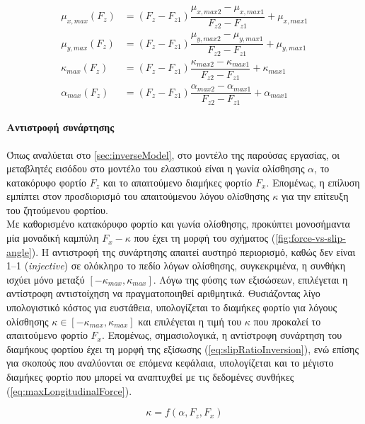 \begin{align}
    \mu_{x,max}(F_z) &= (F_z - F_{z1})
    \dfrac{\mu_{x,max2} - \mu_{x,max1}}{F_{z2}-F_{z1}} + \mu_{x,max1}
    \label{eq:mu_load1}\\[10pt]
    \mu_{y,max}(F_z) &= (F_z - F_{z1})
    \dfrac{\mu_{y,max2} - \mu_{y,max1}}{F_{z2}-F_{z1}} + \mu_{y,max1}
    \label{eq:mu_load2}\\[10pt]
    \kappa_{max}(F_z) &= (F_z - F_{z1})
    \dfrac{\kappa_{max2} - \kappa_{max1}}{F_{z2}-F_{z1}} + \kappa_{max1}
    \label{eq:mu_load3}\\[10pt]
    \alpha_{max}(F_z) &= (F_z - F_{z1})
    \dfrac{\alpha_{max2} - \alpha_{max1}}{F_{z2}-F_{z1}} + \alpha_{max1}
    \label{eq:mu_load}
\end{align}

\paragraph{Αντιστροφή συνάρτησης}
Όπως αναλύεται στο \cref{sec:inverseModel}, στο μοντέλο της παρούσας εργασίας, οι μεταβλητές εισόδου στο μοντέλο του ελαστικού είναι η γωνία ολίσθησης $\alpha$, το κατακόρυφο φορτίο $F_z$ και το απαιτούμενο διαμήκες φορτίο $F_x$. Επομένως, η επίλυση εμπίπτει στον προσδιορισμό του απαιτούμενου λόγου ολίσθησης $\kappa$ για την επίτευξη του ζητούμενου φορτίου.\\[5pt]
\noindent
Με καθορισμένο κατακόρυφο φορτίο και γωνία ολίσθησης, προκύπτει μονοσήμαντα μία μοναδική καμπύλη $F_x - \kappa$ που έχει τη μορφή του σχήματος (\ref{fig:force-vs-slip-angle}). Η αντιστροφή της συνάρτησης απαιτεί αυστηρό περιορισμό, καθώς δεν είναι 1--1 (\textit{injective}) σε ολόκληρο το πεδίο λόγων ολίσθησης, συγκεκριμένα, η συνθήκη ισχύει μόνο μεταξύ $[-\kappa_{max}, \kappa_{max}]$. Λόγω της φύσης των εξισώσεων, επιλέγεται η αντίστροφη αντιστοίχηση να πραγματοποιηθεί αριθμητικά. Θυσιάζοντας λίγο υπολογιστικό κόστος για ευστάθεια, υπολογίζεται το διαμήκες φορτίο για λόγους ολίσθησης $\kappa \in [-\kappa_{max}, \kappa_{max}]$ και επιλέγεται η τιμή του $\kappa$ που προκαλεί το απαιτούμενο φορτίο $F_x$. Επομένως, σημασιολογικά, η αντίστροφη συνάρτηση του διαμήκους φορτίου έχει τη μορφή της εξίσωσης (\ref{eq:slipRatioInversion}), ενώ επίσης για σκοπούς που αναλύονται σε επόμενα κεφάλαια, υπολογίζεται και το μέγιστο διαμήκες φορτίο που μπορεί να αναπτυχθεί με τις δεδομένες συνθήκες (\cref{eq:maxLongitudinalForce}).

\begin{equation}
    \kappa = f(\alpha, F_z, F_x)
    \label{eq:slipRatioInversion}
\end{equation}


